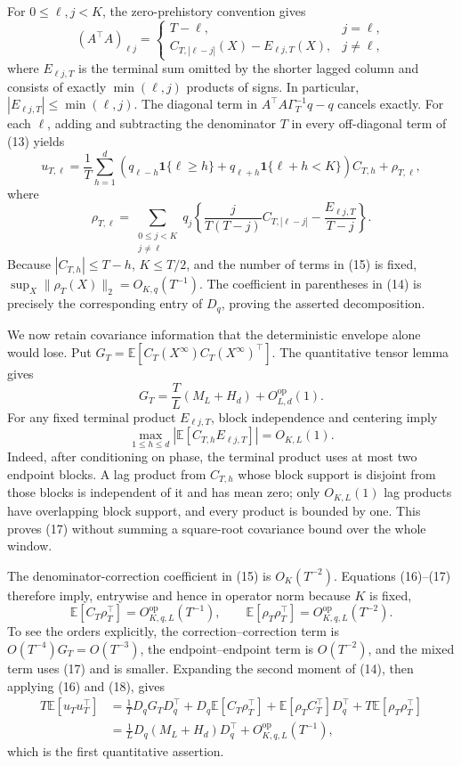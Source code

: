 For \(0\le\ell,j<K\), the zero-prehistory convention gives
\[
(A^{\top}A)_{\ell j}
=\begin{cases}
T-\ell,&j=\ell,\\
C_{T,|\ell-j|}(X)-E_{\ell j,T}(X),&j\ne\ell,
\end{cases} \tag{13}
\]
where \(E_{\ell j,T}\) is the terminal sum omitted by the shorter lagged column and consists of exactly \(\min(\ell,j)\) products of signs.  In particular, \(|E_{\ell j,T}|\le\min(\ell,j)\).  The diagonal term in \(A^{\top}A\Gamma_T^{-1}q-q\) cancels exactly.  For each \(\ell\), adding and subtracting the denominator \(T\) in every off-diagonal term of (13) yields
\[
u_{T,\ell}=\frac1T\sum_{h=1}^d
\left(q_{\ell-h}\mathbf 1\{\ell\ge h\}
+q_{\ell+h}\mathbf 1\{\ell+h<K\}\right)C_{T,h}+\rho_{T,\ell}, \tag{14}
\]
where
\[
\rho_{T,\ell}
=\sum_{\substack{0\le j<K\\j\ne\ell}}q_j
\left\{\frac{j}{T(T-j)}C_{T,|\ell-j|}
-\frac{E_{\ell j,T}}{T-j}\right\}. \tag{15}
\]
Because \(|C_{T,h}|\le T-h\), \(K\le T/2\), and the number of terms in (15) is fixed, \(\sup_X\|\rho_T(X)\|_2=O_{K,q}(T^{-1})\).  The coefficient in parentheses in (14) is precisely the corresponding entry of \(D_q\), proving the asserted decomposition.

We now retain covariance information that the deterministic envelope alone would lose.  Put \(G_T=\mathbb E[C_T(X^{\infty})C_T(X^{\infty})^{\top}]\).  The quantitative tensor lemma gives
\[
G_T=\frac TL(M_L+H_d)+O_{L,d}^{\mathrm{op}}(1). \tag{16}
\]
For any fixed terminal product \(E_{\ell j,T}\), block independence and centering imply
\[
\max_{1\le h\le d}\left|\mathbb E[C_{T,h}E_{\ell j,T}]\right|=O_{K,L}(1). \tag{17}
\]
Indeed, after conditioning on phase, the terminal product uses at most two endpoint blocks.  A lag product from \(C_{T,h}\) whose block support is disjoint from those blocks is independent of it and has mean zero; only \(O_{K,L}(1)\) lag products have overlapping block support, and every product is bounded by one.  This proves (17) without summing a square-root covariance bound over the whole window.

The denominator-correction coefficient in (15) is \(O_K(T^{-2})\).  Equations (16)--(17) therefore imply, entrywise and hence in operator norm because \(K\) is fixed,
\[
\mathbb E[C_T\rho_T^{\top}]=O_{K,q,L}^{\mathrm{op}}(T^{-1}),
\qquad
\mathbb E[\rho_T\rho_T^{\top}]=O_{K,q,L}^{\mathrm{op}}(T^{-2}). \tag{18}
\]
To see the orders explicitly, the correction--correction term is \(O(T^{-4})G_T=O(T^{-3})\), the endpoint--endpoint term is \(O(T^{-2})\), and the mixed term uses (17) and is smaller.  Expanding the second moment of (14), then applying (16) and (18), gives
\[
\begin{aligned}
T\mathbb E[u_Tu_T^{\top}]
&=\frac1T D_qG_TD_q^{\top}
+D_q\mathbb E[C_T\rho_T^{\top}]
+\mathbb E[\rho_TC_T^{\top}]D_q^{\top}
+T\mathbb E[\rho_T\rho_T^{\top}]\\
&=\frac1L D_q(M_L+H_d)D_q^{\top}
+O_{K,q,L}^{\mathrm{op}}(T^{-1}), \tag{19}
\end{aligned}
\]
which is the first quantitative assertion.

